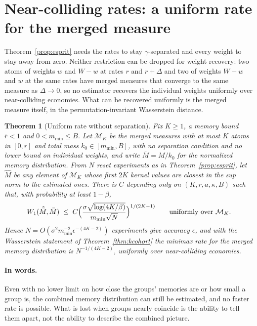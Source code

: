 \documentclass[12pt]{article}
\newtheorem{theorem}{Theorem}[section]
\theoremstyle{definition}
\theoremstyle{remark}
\begin{document}
\section{Near-colliding rates: a uniform rate for the merged measure}\label{sec:uniform}

Theorem~\ref{prop:esprit} needs the rates to stay $\gamma$-separated and every weight to stay away from zero. Neither restriction can be dropped for weight recovery: two atoms of weights $w$ and $W-w$ at rates $r$ and $r+\Delta$ and two of weights $W-w$ and $w$ at the same rates have merged measures that converge to the same measure as $\Delta\to0$, so no estimator recovers the individual weights uniformly over near-colliding economies. What can be recovered uniformly is the merged measure itself, in the permutation-invariant Wasserstein distance.

\begin{theorem}[Uniform rate without separation]\label{thm:uniformw1}
Fix $K\ge1$, a memory bound $\bar r<1$ and $0<m_{\min}\le B$. Let $\mathcal M_K$ be the merged measures with at most $K$ atoms in $[0,\bar r]$ and total mass $k_0\in[m_{\min},B]$, with no separation condition and no lower bound on individual weights, and write $\bar M=M/k_0$ for the normalized memory distribution. From $N$ reset experiments as in Theorem~\ref{prop:esprit}, let $\hat M$ be any element of $\mathcal M_K$ whose first $2K$ kernel values are closest in the sup norm to the estimated ones. There is $C$ depending only on $(K,\bar r,a,\kappa,B)$ such that, with probability at least $1-\beta$,
\[
W_1(\hat{\bar M},\bar M)\;\le\;C\Bigl(\frac{\sigma\sqrt{\log(4K/\beta)}}{m_{\min}\sqrt N}\Bigr)^{1/(2K-1)}\qquad\text{uniformly over }\mathcal M_K .
\]
Hence $N=O(\sigma^2m_{\min}^{-2}\epsilon^{-(4K-2)})$ experiments give accuracy $\epsilon$, and with the Wasserstein statement of Theorem~\ref{thm:kcohort} the minimax rate for the merged memory distribution is $N^{-1/(4K-2)}$, uniformly over near-colliding economies.
\end{theorem}

\paragraph{In words.} Even with no lower limit on how close the groups' memories are or how small a group is, the combined memory distribution can still be estimated, and no faster rate is possible. What is lost when groups nearly coincide is the ability to tell them apart, not the ability to describe the combined picture.
\end{document}
